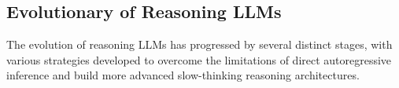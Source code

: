 \subsection{Evolutionary of Reasoning LLMs}\label{evolutionary}


The evolution of reasoning LLMs has progressed by several distinct stages, with various strategies developed to overcome the limitations of direct autoregressive inference and build more advanced slow-thinking reasoning architectures.




                               
                               

